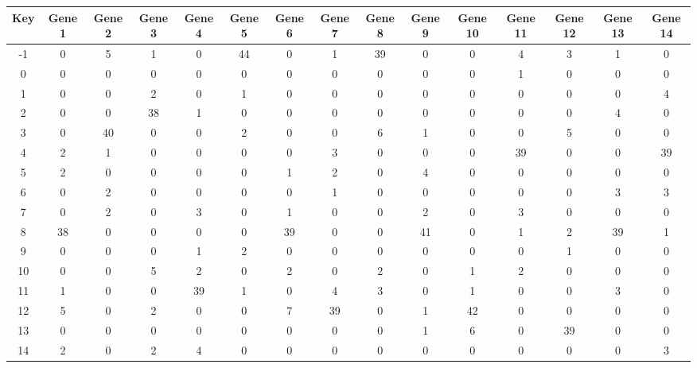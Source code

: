 \begin{tabular}{|c|c|c|c|c|c|c|c|c|c|c|c|c|c|c|}
\hline
Key & Gene 1 & Gene 2 & Gene 3 & Gene 4 & Gene 5 & Gene 6 & Gene 7 & Gene 8 & Gene 9 & Gene 10 & Gene 11 & Gene 12 & Gene 13 & Gene 14 \\
\hline
-1 & 0 & 5 & 1 & 0 & 44 & 0 & 1 & 39 & 0 & 0 & 4 & 3 & 1 & 0 \\
0 & 0 & 0 & 0 & 0 & 0 & 0 & 0 & 0 & 0 & 0 & 1 & 0 & 0 & 0 \\
1 & 0 & 0 & 2 & 0 & 1 & 0 & 0 & 0 & 0 & 0 & 0 & 0 & 0 & 4 \\
2 & 0 & 0 & 38 & 1 & 0 & 0 & 0 & 0 & 0 & 0 & 0 & 0 & 4 & 0 \\
3 & 0 & 40 & 0 & 0 & 2 & 0 & 0 & 6 & 1 & 0 & 0 & 5 & 0 & 0 \\
4 & 2 & 1 & 0 & 0 & 0 & 0 & 3 & 0 & 0 & 0 & 39 & 0 & 0 & 39 \\
5 & 2 & 0 & 0 & 0 & 0 & 1 & 2 & 0 & 4 & 0 & 0 & 0 & 0 & 0 \\
6 & 0 & 2 & 0 & 0 & 0 & 0 & 1 & 0 & 0 & 0 & 0 & 0 & 3 & 3 \\
7 & 0 & 2 & 0 & 3 & 0 & 1 & 0 & 0 & 2 & 0 & 3 & 0 & 0 & 0 \\
8 & 38 & 0 & 0 & 0 & 0 & 39 & 0 & 0 & 41 & 0 & 1 & 2 & 39 & 1 \\
9 & 0 & 0 & 0 & 1 & 2 & 0 & 0 & 0 & 0 & 0 & 0 & 1 & 0 & 0 \\
10 & 0 & 0 & 5 & 2 & 0 & 2 & 0 & 2 & 0 & 1 & 2 & 0 & 0 & 0 \\
11 & 1 & 0 & 0 & 39 & 1 & 0 & 4 & 3 & 0 & 1 & 0 & 0 & 3 & 0 \\
12 & 5 & 0 & 2 & 0 & 0 & 7 & 39 & 0 & 1 & 42 & 0 & 0 & 0 & 0 \\
13 & 0 & 0 & 0 & 0 & 0 & 0 & 0 & 0 & 1 & 6 & 0 & 39 & 0 & 0 \\
14 & 2 & 0 & 2 & 4 & 0 & 0 & 0 & 0 & 0 & 0 & 0 & 0 & 0 & 3 \\
\hline
\end{tabular}